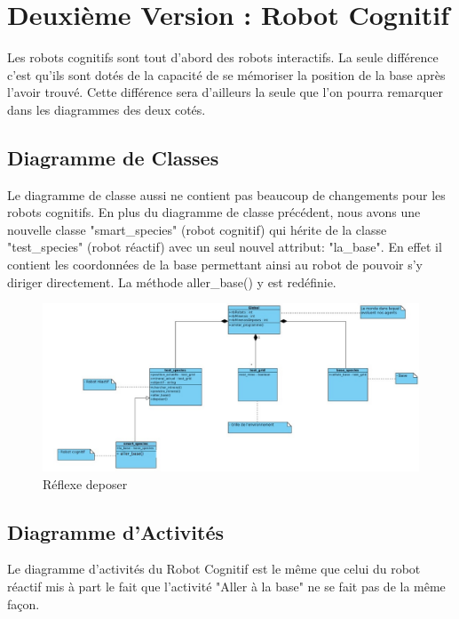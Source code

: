 \chapter{Deuxième Version : Robot Cognitif}


Les robots  cognitifs sont tout d'abord des robots interactifs. La seule différence c'est qu'ils sont dotés de la capacité de se mémoriser la position de la base après l'avoir trouvé. Cette différence sera d'ailleurs la seule que l'on pourra remarquer dans les diagrammes des deux cotés.


\section{Diagramme de Classes}

Le diagramme de classe aussi ne contient pas beaucoup de changements pour les robots cognitifs. En plus du diagramme de classe précédent, nous avons une nouvelle classe "smart\_species" (robot cognitif) qui hérite de la classe "test\_species" (robot réactif) avec un seul nouvel attribut: "la\_base". En effet il contient les coordonnées de la base permettant ainsi au robot de pouvoir s'y diriger directement. La méthode aller\_base() y est redéfinie.

\begin{figure}[!h]
	\begin{center}
		\includegraphics[width=500pt]{diagrammes/diagramme_classe_cognitif}
	\end{center}
	\caption{Réflexe deposer}
\end{figure}

\section{Diagramme d'Activités}

Le diagramme d'activités du Robot Cognitif est le même que celui du robot réactif mis à part le fait que l'activité "Aller à la base" ne se fait pas de la même façon.
\newpage

